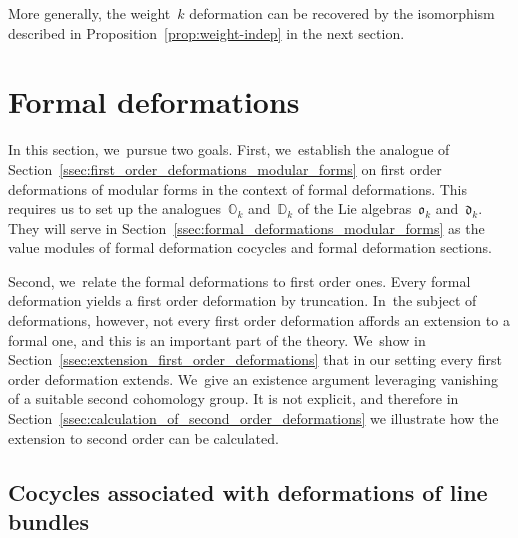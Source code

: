 \documentclass[JEP,XML,SOM,Unicode,published]{cedram}
\theoremstyle{plain}
\theoremstyle{definition}
\newcommand{\bbD}{\ensuremath{\mathbb{D}}}
\newcommand{\bbO}{\ensuremath{\mathbb{O}}}
\newcommand{\frakd}{\ensuremath{\mathfrak{d}}}
\newcommand{\frako}{\ensuremath{\mathfrak{o}}}
\begin{document}
More generally, the weight~$k$ deformation can be recovered by the isomorphism described in Proposition~\ref{prop:weight-indep} in the next section.

\section{Formal deformations}
\label{sec:formal_deformations}

In this section, we~pursue two goals. First, we~establish the analogue of Section~\ref{ssec:first_order_deformations_modular_forms} on first order deformations of modular forms in the context of formal deformations. This requires us to set up the analogues~$\bbO_k$ and~$\bbD_k$ of the Lie algebras~$\frako_k$ and~$\frakd_k$. They will serve in Section~\ref{ssec:formal_deformations_modular_forms} as the value modules of formal deformation cocycles and formal deformation sections.

Second, we~relate the formal deformations to first order ones. Every formal deformation yields a first order deformation by truncation. In~the subject of deformations, however, not every first order deformation affords an extension to a formal one, and this is an important part of the theory. We~show in Section~\ref{ssec:extension_first_order_deformations} that in our setting every first order deformation extends. We~give an existence argument leveraging vanishing of a suitable second cohomology group. It is not explicit, and therefore in Section~\ref{ssec:calculation_of_second_order_deformations} we illustrate how the extension to second order can be calculated.

\subsection{Cocycles associated with deformations of line bundles}
\label{ssec:formal_cocycles_line_bundle}
\end{document}
